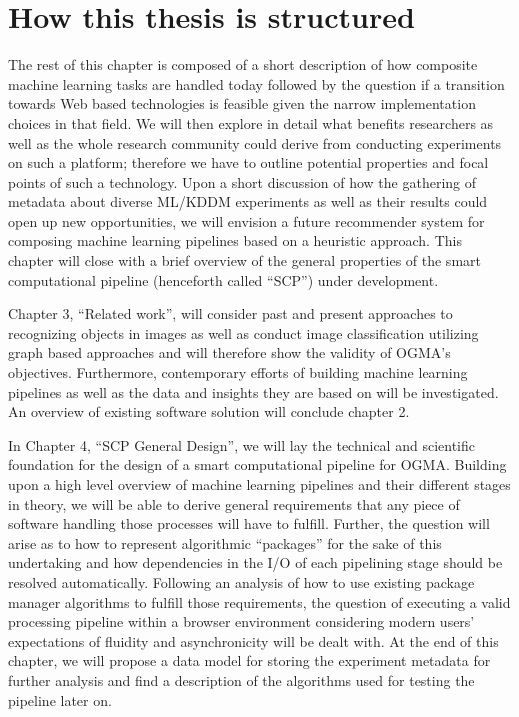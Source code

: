 \section{How this thesis is structured}
\label{section:thesis_structure}

The rest of this chapter is composed of a short description of how composite machine learning tasks are handled today followed by the question if a transition towards Web based technologies is feasible given the narrow implementation choices in that field. We will then explore in detail what benefits researchers as well as the whole research community could derive from conducting experiments on such a platform; therefore we have to outline potential properties and focal points of such a technology. Upon a short discussion of how the gathering of metadata about diverse ML/KDDM experiments as well as their results could open up new opportunities, we will envision a future recommender system for composing machine learning pipelines based on a heuristic approach. This chapter will close with a brief overview of the general properties of the smart computational pipeline (henceforth called ``SCP'') under development.

\par

Chapter 3, ``Related work'', will consider past and present approaches to recognizing objects in images as well as conduct image classification utilizing graph based approaches and will therefore show the validity of OGMA's objectives. Furthermore, contemporary efforts of building machine learning pipelines as well as the data and insights they are based on will be investigated. An overview of existing software solution will conclude chapter 2.

\par

In Chapter 4, ``SCP General Design'', we will lay the technical and scientific foundation for the design of a smart computational pipeline for OGMA. Building upon a high level overview of machine learning pipelines and their different stages in theory, we will be able to derive general requirements that any piece of software handling those processes will have to fulfill. Further, the question will arise as to how to represent algorithmic ``packages'' for the sake of this undertaking and how dependencies in the I/O of each pipelining stage should be resolved automatically. Following an analysis of how to use existing package manager algorithms to fulfill those requirements, the question of executing a valid processing pipeline within a browser environment considering modern users' expectations of fluidity and asynchronicity will be dealt with. At the end of this chapter, we will propose a data model for storing the experiment metadata for further analysis and find a description of the algorithms used for testing the pipeline later on.

